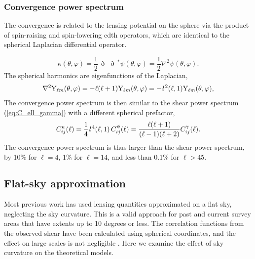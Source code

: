 \documentclass[useAMS,usenatbib]{mn2e} %
\newcommand{\ellbar}{\hbox{\it \l}\,}
\newcommand{\edth}{\,\eth\,}
\begin{document}
\subsubsection{Convergence power spectrum}

The convergence is related to the lensing potential on the sphere via the
product of spin-raising and spin-lowering edth operators, which are identical
to the spherical Laplacian differential operator.

%
\begin{equation}
  \kappa(\theta, \varphi) = \frac 1 2 \edth \edth^\ast \psi(\theta, \varphi) = \frac 1 2 \nabla^2 \psi(\theta, \varphi).
  \label{eq:kappa_psi_spher}
\end{equation}
%
The spherical harmonics are eigenfunctions of the Laplacian,
%
\begin{equation}
  \nabla^2 {\rm Y}_{\ell m}(\theta, \varphi) = - \ell (\ell + 1) {\rm Y}_{\ell m}(\theta, \varphi)
    = - \ellbar^2(\ell, 1) {\rm Y}_{\ell m}(\theta, \varphi),
  \label{eq:nabla_Ylm}
\end{equation}
%
The convergence power spectrum is then similar to the shear power spectrum
(\ref{eq:C_ell_gamma}) with a different spherical prefactor,
%
\begin{equation}
  C^\kappa_{ij}(\ell) = \frac 1 4 \ellbar^4(\ell, 1) \, C^\psi_{ij}(\ell)
    = \frac{\ell (\ell+1)}{(\ell-1)(\ell+2)} C^\gamma_{ij}(\ell) .
  \label{eq:C_ell_kappa_full}
\end{equation}
%
The convergence power spectrum is thus larger than the shear power spectrum, by
10\% for $\ell=4$, 1\% for $\ell = 14$, and less than 0.1\% for $\ell>45$.


\subsection{Flat-sky approximation}

Most previous work has used lensing quantities approximated on a flat sky,
neglecting the sky curvature. This is a valid approach for past and current
survey areas that have extents up to 10 degrees or less. The correlation
functions from the observed shear have been calculated using spherical
coordinates, and the effect on large scales is not negligible \cite{FSHK08}.
Here we examine the effect of sky curvature on the theoretical models.
\end{document}
